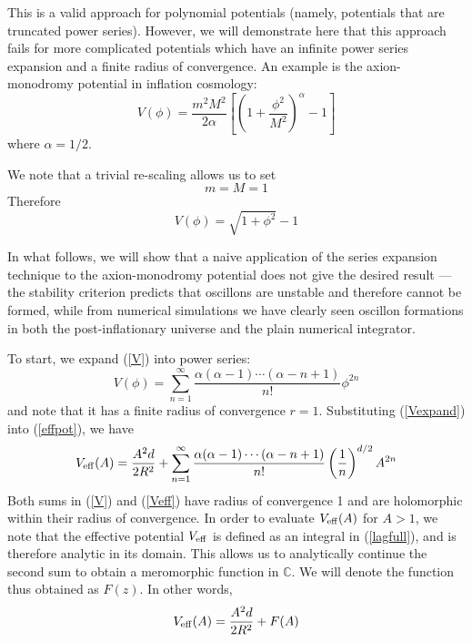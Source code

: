 \documentclass{report}
\begin{document}
This is a valid approach for polynomial potentials (namely, potentials that are truncated power series). However, we will demonstrate here that this approach fails for more complicated potentials which have an infinite power series expansion and a finite radius of convergence. An example is the axion-monodromy potential in inflation cosmology:
\begin{equation}
  V(\phi) = \frac{m^2M^2}{2\alpha}\left[\left(1+\frac{\phi^2}{M^2}\right)^\alpha-1\right]
\end{equation}
where $\alpha=1/2$.

We note that a trivial re-scaling allows us to set
\begin{equation}
  m=M=1
\end{equation}
Therefore
\begin{equation}\label{V}
  V(\phi)=\sqrt{1+\phi^2}-1
\end{equation}

In what follows, we will show that a naive application of the series expansion technique to the axion-monodromy potential does not give the desired result --- the stability criterion predicts that oscillons are unstable and therefore cannot be formed, while from numerical simulations we have clearly seen oscillon formations in both the post-inflationary universe and the plain numerical integrator.

To start, we expand (\ref{V}) into power series:
\begin{equation}\label{Vexpand}
  V(\phi)=\sum_{n=1}^\infty\frac{\alpha(\alpha-1)\cdots(\alpha-n+1)}{n!}\phi^{2n}
\end{equation}
and note that it has a finite radius of convergence $r=1$. Substituting (\ref{Vexpand}) into (\ref{effpot}), we have
\begin{equation}\label{Veff}
  V_{\rm eff}(A)=\frac{A^2d}{2R^2} + \sum_{n=1}^\infty\frac{\alpha(\alpha-1)\cdots(\alpha-n+1)}{n!}
  \left(\frac{1}{n}\right)^{d/2}A^{2n}
\end{equation}
Both sums in (\ref{V}) and (\ref{Veff}) have radius of convergence 1 and are holomorphic within their radius of convergence. In order to evaluate $V_{\rm eff}(A)$ for $A>1$, we note that the effective potential $V_{\rm eff}$ is defined as an integral in (\ref{lagfull}), and is therefore analytic in its domain. This allows us to analytically continue the second sum to obtain a meromorphic function in $\mathbb{C}$. We will denote the function thus obtained as $F(z)$. In other words,
\begin{equation}\label{VeffFz}
  V_{\rm eff}(A) = \frac{A^2d}{2R^2} + F(A)
\end{equation}
\end{document}
